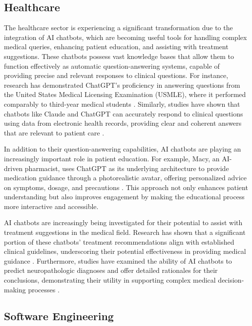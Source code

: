 \subsection{Healthcare}

The healthcare sector is experiencing a significant transformation due to the integration of AI chatbots, which are becoming useful tools for handling complex medical queries, enhancing patient education, and assisting with treatment suggestions. These chatbots possess vast knowledge bases that allow them to function effectively as automatic question-answering systems, capable of providing precise and relevant responses to clinical questions. For instance, research has demonstrated ChatGPT's proficiency in answering questions from the United States Medical Licensing Examination (USMLE), where it performed comparably to third-year medical students \cite{gilson2023does}. Similarly, studies have shown that chatbots like Claude and ChatGPT can accurately respond to clinical questions using data from electronic health records, providing clear and coherent answers that are relevant to patient care \cite{hamidi2023evaluation}.

In addition to their question-answering capabilities, AI chatbots are playing an increasingly important role in patient education. For example, Macy, an AI-driven pharmacist, uses ChatGPT as its underlying architecture to provide medication guidance through a photorealistic avatar, offering personalized advice on symptoms, dosage, and precautions \cite{leung2023}. This approach not only enhances patient understanding but also improves engagement by making the educational process more interactive and accessible.

AI chatbots are increasingly being investigated for their potential to assist with treatment suggestions in the medical field. Research has shown that a significant portion of these chatbots’ treatment recommendations align with established clinical guidelines, underscoring their potential effectiveness in providing medical guidance \cite{chen2023use}. Furthermore, studies have examined the ability of AI chatbots to predict neuropathologic diagnoses and offer detailed rationales for their conclusions, demonstrating their utility in supporting complex medical decision-making processes \cite{koga2024evaluating}.

\subsection{Software Engineering}

